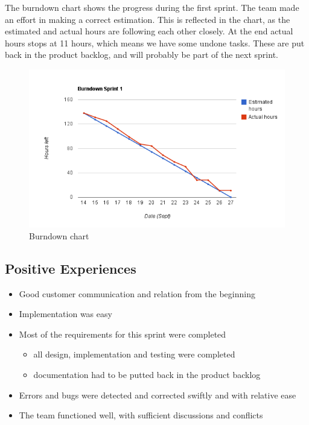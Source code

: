 The burndown chart shows the progress during the first sprint. The team made an effort in making a correct estimation. This is reflected in the chart, as the estimated and actual hours are  following each other closely. At the end actual hours stops at 11 hours, which means we have some undone tasks. These are put back in the product backlog, and will probably be part of the next sprint. 

\begin{figure}[!htb]
	\includegraphics[width=\textwidth]{./sprints/img/burndown_chart_s1.png}
	\caption{Burndown chart\label{fig:sp1_burndown}}
\end{figure}

\subsection{Positive Experiences}
\begin{itemize}
	\item Good customer communication and relation from the beginning
	\item Implementation was easy
	\item Most of the requirements for this sprint were completed
	\begin{itemize} 
		\item all design, implementation and testing were completed
		\item documentation had to be putted back in the product backlog 
	\end{itemize}
	\item Errors and bugs were detected and corrected swiftly and with relative ease
	\item The team functioned well, with sufficient discussions and conflicts
\end{itemize}

